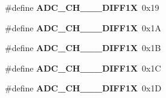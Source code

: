 \begin{CompactItemize}
\item 
\hypertarget{group__a2d_gad51db92aecbfe211871a3099d7fbd7e}{
\#define \textbf{ADC\_\-CH\_\_\_\-DIFF1X}~0x19}
\label{group__a2d_gad51db92aecbfe211871a3099d7fbd7e}

\item 
\hypertarget{group__a2d_g71ceaea7dd64c28705ccdc84c09f9e48}{
\#define \textbf{ADC\_\-CH\_\_\_\-DIFF1X}~0x1A}
\label{group__a2d_g71ceaea7dd64c28705ccdc84c09f9e48}

\item 
\hypertarget{group__a2d_g13d286d6aa04046617a96eef9804c40a}{
\#define \textbf{ADC\_\-CH\_\_\_\-DIFF1X}~0x1B}
\label{group__a2d_g13d286d6aa04046617a96eef9804c40a}

\item 
\hypertarget{group__a2d_ga2fd7fa7726846b7399e0a9e8ca8254a}{
\#define \textbf{ADC\_\-CH\_\_\_\-DIFF1X}~0x1C}
\label{group__a2d_ga2fd7fa7726846b7399e0a9e8ca8254a}

\item 
\hypertarget{group__a2d_g92a15defe2e018615ed50b8e756d960c}{
\#define \textbf{ADC\_\-CH\_\_\_\-DIFF1X}~0x1D}
\label{group__a2d_g92a15defe2e018615ed50b8e756d960c}

\end{CompactItemize}
